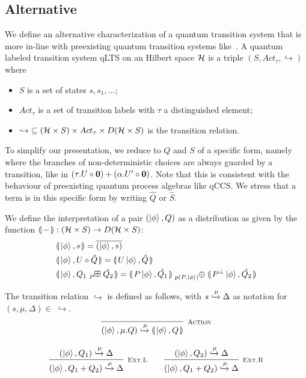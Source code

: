 \subsection{Alternative}
We define an alternative characterization of a quantum transition system that is more in-line with preexisting quantum transition systems like~\cite{Feng:2012, Deng:2012}.
A quantum labeled transition system qLTS on an Hilbert space $\mathcal{H}$ is a triple $(S, Act_\tau, \hookrightarrow)$ where
\begin{itemize}
	\item $S$ is a set of states $s, s_1, \dots$;
	\item $Act_\tau$ is a set of transition labels with $\tau$ a distinguished element;
  \item $\hookrightarrow\;\subseteq (\mathcal{H} \times S) \times Act_\tau \times D(\mathcal{H} \times S)$ is the transition relation. 
\end{itemize}

To simplify our presentation, we reduce to $Q$ and $S$ of a specific form, namely where the branches of non-deterministic choices are always guarded by a transition, like in $(\tau. U \circ \mathbf{0}) + (\alpha . U' \circ \mathbf{0})$.
Note that this is consistent with the behaviour of preexisting quantum process algebras like qCCS.
We stress that a term is in this specific form by writing $\hat{Q}$ or $\hat{S}$.

We define the interpretation of a pair $(\ket{\phi}, Q)$ as a distribution as given by the function $\llparenthesis\,{-}\,\rrparenthesis : (\mathcal{H} \times S) \to D(\mathcal{H} \times S)$:
\begin{align*}
	&\sema{\ket{\phi}, s} = \overline{(\ket{\phi}, s)} \\
	&\sema{\ket{\phi}, U \circ \hat{Q}} = \sema{U\ket{\phi}, \hat{Q}} \\
	&\sema{\ket{\phi}, Q_1 \qsum{P} \hat{Q_2} } = \sema{P \ket{\phi}, \hat{Q_1}} \psum{p(P, \ket{\phi})} \sema{P^{\bot}\ket{\phi}, \hat{Q_2}} 
\end{align*}

The transition relation $\hookrightarrow$ is defined as follows, with $s \xhookrightarrow{\mu} \Delta$ as notation for $(s, \mu, \Delta) \in\;\hookrightarrow$.
\begin{gather*}
  \infer[\mbox{\footnotesize\scshape Action}]{(\ket{\phi}, \mu.Q) \xhookrightarrow{\mu} \sema{\ket{\phi}, Q}}{} \\[0.3cm]
  \infer[\mbox{\footnotesize\scshape Ext.L}]{(\ket{\phi}, Q_1 + Q_2) \xhookrightarrow{\mu} \Delta}{(\ket{\phi}, Q_1) \xhookrightarrow{\mu} \Delta} \qquad
  \infer[\mbox{\footnotesize\scshape Ext.R}]{(\ket{\phi}, Q_1 + Q_2) \xhookrightarrow{\mu} \Delta}{(\ket{\phi}, Q_2) \xhookrightarrow{\mu} \Delta}
\end{gather*}

